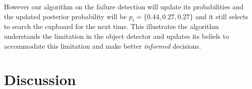 
However our algorithm on the failure detection will update its probabilities and the updated posterior probability will be $ p_i = \{ 0.44, 0.27, 0.27\}$ and it still selects to search the cupboard for the next time. This illustrates the algorithm understands the limitation in the object detector and updates its beliefs to accommodate this limitation and make better \emph{informed} decisions.  


\section{Discussion}

